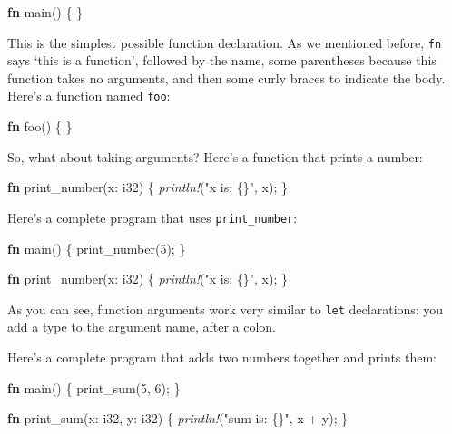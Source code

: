 \documentclass[a4paper,]{book}
\newenvironment{Shaded}{\begin{snugshade}}{\end{snugshade}}
\newcommand{\KeywordTok}[1]{\textcolor[rgb]{0.13,0.29,0.53}{\textbf{{#1}}}}
\newcommand{\DataTypeTok}[1]{\textcolor[rgb]{0.13,0.29,0.53}{{#1}}}
\newcommand{\DecValTok}[1]{\textcolor[rgb]{0.00,0.00,0.81}{{#1}}}
\newcommand{\StringTok}[1]{\textcolor[rgb]{0.31,0.60,0.02}{{#1}}}
\newcommand{\PreprocessorTok}[1]{\textcolor[rgb]{0.56,0.35,0.01}{\textit{{#1}}}}
\newcommand{\NormalTok}[1]{{#1}}
\begin{document}
\begin{Shaded}
\begin{Highlighting}[]
\KeywordTok{fn} \NormalTok{main() \{}
\NormalTok{\}}
\end{Highlighting}
\end{Shaded}

This is the simplest possible function declaration. As we mentioned
before, \texttt{fn} says `this is a function', followed by the name,
some parentheses because this function takes no arguments, and then some
curly braces to indicate the body. Here's a function named \texttt{foo}:

\begin{Shaded}
\begin{Highlighting}[]
\KeywordTok{fn} \NormalTok{foo() \{}
\NormalTok{\}}
\end{Highlighting}
\end{Shaded}

So, what about taking arguments? Here's a function that prints a number:

\begin{Shaded}
\begin{Highlighting}[]
\KeywordTok{fn} \NormalTok{print_number(x: }\DataTypeTok{i32}\NormalTok{) \{}
    \PreprocessorTok{println!}\NormalTok{(}\StringTok{"x is: \{\}"}\NormalTok{, x);}
\NormalTok{\}}
\end{Highlighting}
\end{Shaded}

Here's a complete program that uses \texttt{print\_number}:

\begin{Shaded}
\begin{Highlighting}[]
\KeywordTok{fn} \NormalTok{main() \{}
    \NormalTok{print_number(}\DecValTok{5}\NormalTok{);}
\NormalTok{\}}

\KeywordTok{fn} \NormalTok{print_number(x: }\DataTypeTok{i32}\NormalTok{) \{}
    \PreprocessorTok{println!}\NormalTok{(}\StringTok{"x is: \{\}"}\NormalTok{, x);}
\NormalTok{\}}
\end{Highlighting}
\end{Shaded}

As you can see, function arguments work very similar to \texttt{let}
declarations: you add a type to the argument name, after a colon.

Here's a complete program that adds two numbers together and prints
them:

\begin{Shaded}
\begin{Highlighting}[]
\KeywordTok{fn} \NormalTok{main() \{}
    \NormalTok{print_sum(}\DecValTok{5}\NormalTok{, }\DecValTok{6}\NormalTok{);}
\NormalTok{\}}

\KeywordTok{fn} \NormalTok{print_sum(x: }\DataTypeTok{i32}\NormalTok{, y: }\DataTypeTok{i32}\NormalTok{) \{}
    \PreprocessorTok{println!}\NormalTok{(}\StringTok{"sum is: \{\}"}\NormalTok{, x + y);}
\NormalTok{\}}
\end{Highlighting}
\end{Shaded}
\end{document}
